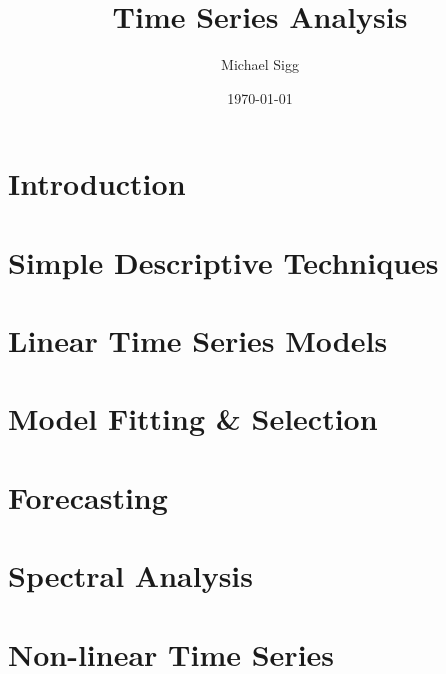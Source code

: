 \documentclass[11pt]{article}
\title{Time Series Analysis}
\author{Michael Sigg}
\date{\today}
\begin{document}
\maketitle
\tableofcontents

\section{Introduction}


\section{Simple Descriptive Techniques}


\section{Linear Time Series Models}


\section{Model Fitting \& Selection}


\section{Forecasting}


\section{Spectral Analysis}


\section{Non-linear Time Series}

\end{document}
